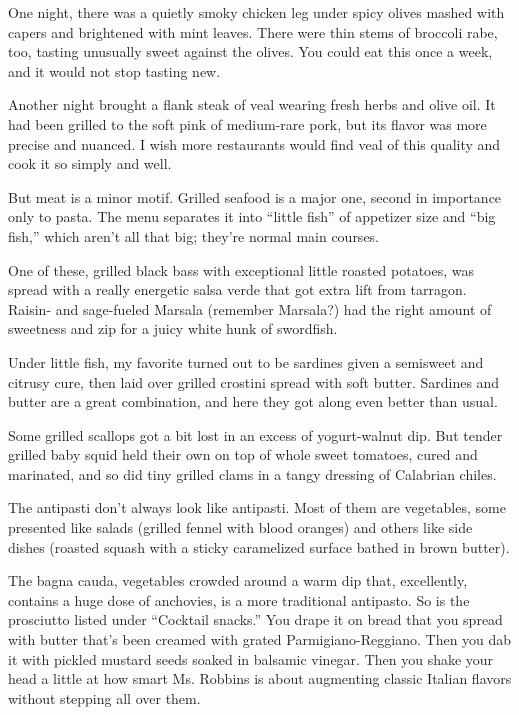 One night, there was a quietly smoky chicken leg under spicy olives
mashed with capers and brightened with mint leaves. There were thin
stems of broccoli rabe, too, tasting unusually sweet against the olives.
You could eat this once a week, and it would not stop tasting new.

Another night brought a flank steak of veal wearing fresh herbs and
olive oil. It had been grilled to the soft pink of medium-rare pork, but
its flavor was more precise and nuanced. I wish more restaurants would
find veal of this quality and cook it so simply and well.

But meat is a minor motif. Grilled seafood is a major one, second in
importance only to pasta. The menu separates it into ``little fish'' of
appetizer size and ``big fish,'' which aren't all that big; they're
normal main courses.

One of these, grilled black bass with exceptional little roasted
potatoes, was spread with a really energetic salsa verde that got extra
lift from tarragon. Raisin- and sage-fueled Marsala (remember Marsala?)
had the right amount of sweetness and zip for a juicy white hunk of
swordfish.

Under little fish, my favorite turned out to be sardines given a
semisweet and citrusy cure, then laid over grilled crostini spread with
soft butter. Sardines and butter are a great combination, and here they
got along even better than usual.

Some grilled scallops got a bit lost in an excess of yogurt-walnut dip.
But tender grilled baby squid held their own on top of whole sweet
tomatoes, cured and marinated, and so did tiny grilled clams in a tangy
dressing of Calabrian chiles.

The antipasti don't always look like antipasti. Most of them are
vegetables, some presented like salads (grilled fennel with blood
oranges) and others like side dishes (roasted squash with a sticky
caramelized surface bathed in brown butter).

The bagna cauda, vegetables crowded around a warm dip that, excellently,
contains a huge dose of anchovies, is a more traditional antipasto. So
is the prosciutto listed under ``Cocktail snacks.'' You drape it on
bread that you spread with butter that's been creamed with grated
Parmigiano-Reggiano. Then you dab it with pickled mustard seeds soaked
in balsamic vinegar. Then you shake your head a little at how smart Ms.
Robbins is about augmenting classic Italian flavors without stepping all
over them.

